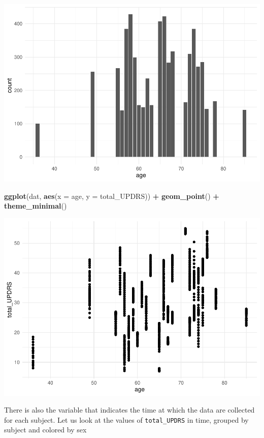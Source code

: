 \documentclass[
]{article}
\newenvironment{Shaded}{\begin{snugshade}}{\end{snugshade}}
\newcommand{\AttributeTok}[1]{\textcolor[rgb]{0.13,0.29,0.53}{#1}}
\newcommand{\FunctionTok}[1]{\textcolor[rgb]{0.13,0.29,0.53}{\textbf{#1}}}
\newcommand{\NormalTok}[1]{#1}
\newcommand{\SpecialCharTok}[1]{\textcolor[rgb]{0.81,0.36,0.00}{\textbf{#1}}}
\begin{document}
\includegraphics{Data_Exploration_files/figure-latex/unnamed-chunk-11-1.pdf}

\begin{Shaded}
\begin{Highlighting}[]
\FunctionTok{ggplot}\NormalTok{(dat, }\FunctionTok{aes}\NormalTok{(}\AttributeTok{x =}\NormalTok{ age, }\AttributeTok{y =}\NormalTok{ total\_UPDRS)) }\SpecialCharTok{+}
  \FunctionTok{geom\_point}\NormalTok{() }\SpecialCharTok{+} 
  \FunctionTok{theme\_minimal}\NormalTok{()}
\end{Highlighting}
\end{Shaded}

\includegraphics{Data_Exploration_files/figure-latex/unnamed-chunk-11-2.pdf}

There is also the variable that indicates the time at which the data are
collected for each subject. Let us look at the values of
\texttt{total\_UPDRS} in time, grouped by subject and colored by sex
\end{document}
